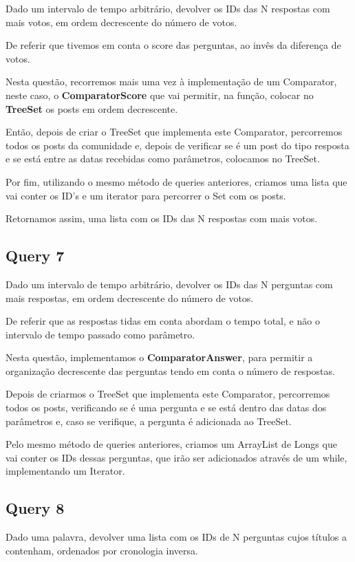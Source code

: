 \documentclass[a4paper]{article}
\begin{document}
Dado um intervalo de tempo arbitrário, devolver os IDs das N respostas 
com mais votos, em ordem decrescente do número de votos.

De referir que tivemos em conta o score das perguntas, ao invês da
diferença de votos.

Nesta questão, recorremos mais uma vez à implementação de um Comparator, neste caso,
o \textbf{ComparatorScore} que vai permitir, na função, colocar no \textbf{TreeSet}
os posts em ordem decrescente.

Então, depois de criar o TreeSet que implementa este Comparator, percorremos todos 
os posts da comunidade e, depois de verificar se é um post do tipo resposta e se 
está entre as datas recebidas como parâmetros, colocamos no TreeSet.

Por fim, utilizando o mesmo método de queries anteriores, criamos uma lista que vai
conter os ID's e um iterator para percorrer o Set com os posts. 

Retornamos assim, uma lista com os IDs das N respostas com mais votos.

\subsection{Query 7}

Dado um intervalo de tempo arbitrário, devolver os IDs das N perguntas 
com mais respostas, em ordem decrescente do número de votos.

De referir que as respostas tidas em conta abordam o tempo total, e
não o intervalo de tempo passado como parâmetro.

Nesta questão, implementamos o \textbf{ComparatorAnswer}, para permitir a 
organização decrescente das perguntas tendo em conta o número de respostas.

Depois de criarmos o TreeSet que implementa este Comparator, percorremos todos os
posts, verificando se é uma pergunta e se está dentro das datas dos parâmetros e,
caso se verifique, a pergunta é adicionada ao TreeSet.

Pelo mesmo método de queries anteriores, criamos um  ArrayList de Longs que vai
conter os IDs dessas perguntas, que irão ser adicionados através de um while,
implementando um Iterator.

\subsection{Query 8}

Dado uma palavra, devolver uma lista com os IDs de N perguntas
cujos títulos a contenham, ordenados por cronologia inversa.
\end{document}
